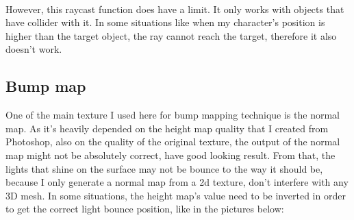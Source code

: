 \documentclass[a4paper, 13pt]{extarticle}
\begin{document}
{\begin{figure}[h!]
\begin{minipage}{.5\textwidth}
 		\label{fig:test42}
 		\end{minipage}
	 \end{figure} \\
	 However, this raycast function does have a limit. It only works with objects that have collider with it. In some situations like when my character's position is higher than the target object, the ray cannot reach the target, therefore it also doesn't work.
	
\subsection{Bump map} 	
	 One of the main texture I used here for bump mapping technique is the normal map. As it's heavily depended on the height map quality that I created from Photoshop, also on the quality of the original texture, the output of the normal map might not be absolutely correct, have good looking result. From that, the lights that shine on the surface may not be bounce to the way it should be, because I only generate a normal map from a 2d texture, don't interfere with any 3D mesh. In some situations, the height map's value need to be inverted in order to get the correct light bounce position, like in the pictures below:
	 
}
\end{document}

